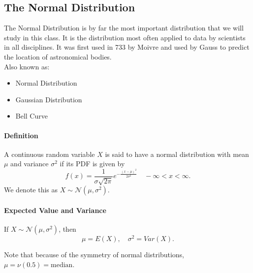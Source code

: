 \subsection{The Normal Distribution}
\hrulefill

The Normal Distribution is by far the most important distribution that we will study in this class.
It is the distribution most often applied to data by scientists in all disciplines. It was first used 
in 733 by Moivre and used by Gauss to predict the location of astronomical bodies.\\

Also known as:
\begin{itemize}
    \item Normal Distribution
    \item Gaussian Distribution
    \item Bell Curve
\end{itemize}

\paragraph*{Definition}
A continuous random variable $X$ is said to have a normal distribution with mean $\mu$ and 
variance $\sigma^2$ if its PDF is given by
\[f(x) = \frac{1}{\sigma \sqrt{2 \pi}} e^{-\frac{(x - \mu)^2}{2 \sigma^2}} \quad -\infty < x < \infty.\]
We denote this as $X \sim \mathcal{N}(\mu, \sigma^2)$.

\paragraph*{Expected Value and Variance}
If $X \sim \mathcal{N}(\mu, \sigma^2)$, then
\[\mu = E(X), \quad \sigma^2 = Var(X).\]

Note that because of the symmetry of normal distributions, $\mu = \nu(0.5) = \text{median}$.